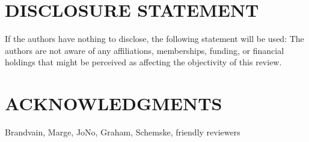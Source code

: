 \documentclass{ar-1col}
\begin{document}
\section*{DISCLOSURE STATEMENT}
If the authors have nothing to disclose, the following statement will be used: The authors are not aware of any affiliations, memberships, funding, or financial holdings that
might be perceived as affecting the objectivity of this review. 

\section*{ACKNOWLEDGMENTS}
Brandvain, Marge, JoNo, Graham, Schemske, friendly reviewers
\end{document}
